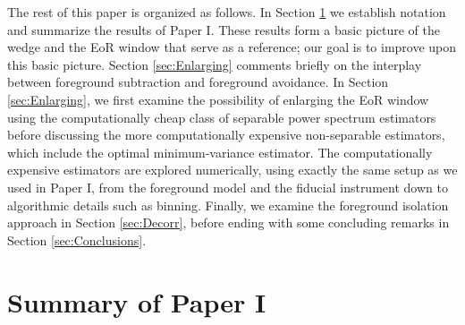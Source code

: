 \documentclass[twocolumn,aps,prd,nofootinbib,showpacs]{revtex4-1}
\begin{document}
The rest of this paper is organized as follows.  In Section \ref{sec:PaperI} we establish notation and summarize the results of Paper I.  These results form a basic picture of the wedge and the EoR window that serve as a reference; our goal is to improve upon this basic picture.  Section \ref{sec:Enlarging} comments briefly on the interplay between foreground subtraction and foreground avoidance.  In Section \ref{sec:Enlarging}, we first examine the possibility of enlarging the EoR window using the computationally cheap class of separable power spectrum estimators before discussing the more computationally expensive non-separable estimators, which include the optimal minimum-variance estimator.  The computationally expensive estimators are explored numerically, using exactly the same setup as we used in Paper I, from the foreground model and the fiducial instrument down to algorithmic details such as binning.  Finally, we examine the foreground isolation approach in Section \ref{sec:Decorr}, before ending with some concluding remarks in Section \ref{sec:Conclusions}.

\section{Summary of Paper I}
\label{sec:PaperI}
\end{document}
